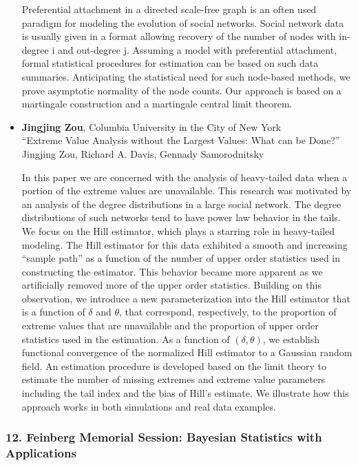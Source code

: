 \begin{itemize}
Preferential attachment in a directed scale-free graph is an often used paradigm for modeling the evolution of social networks. Social network data is usually given in a format allowing recovery of the number of nodes with in-degree i and out-degree j. Assuming a model with preferential attachment, formal statistical procedures for estimation can be based on such data summaries. Anticipating the statistical need for such node-based methods, we prove asymptotic normality of the node counts. Our approach is based on a martingale construction and a martingale central limit theorem.

\item \textbf{Jingjing Zou}, Columbia University in the City of New York \\
``Extreme Value Analysis without the Largest Values: What can be Done?'' \\
Jingjing Zou, Richard A. Davis, Gennady Samorodnitsky


In this paper we are concerned with the analysis of heavy-tailed data when a portion of the extreme values are unavailable. 
This research was motivated by an analysis of the degree distributions in a large social network. The degree distributions of such networks tend to have power law behavior in the tails. 
We focus on the Hill estimator, which plays a starring role in heavy-tailed modeling. 
The Hill estimator for this data exhibited a smooth and increasing ``sample path'' as a function of the number of upper order statistics used in constructing the estimator.  
This behavior became more apparent as we artificially removed more of the upper order statistics. Building on this observation, we introduce a new parameterization into the Hill estimator that is a function of $\delta$ and $\theta$, that correspond, respectively, to the proportion of extreme values that are unavailable and the proportion of upper order statistics used in the estimation.
As a function of $(\delta, \theta)$, we establish functional convergence of the normalized Hill estimator to a Gaussian random field. An estimation procedure is developed based on the limit theory to estimate the number of missing extremes and extreme value parameters including the tail index and the bias of Hill's estimate. We illustrate how this approach works in both simulations and real data examples.

\end{itemize}

\subsubsection*{12. Feinberg Memorial Session: Bayesian Statistics with Applications}

